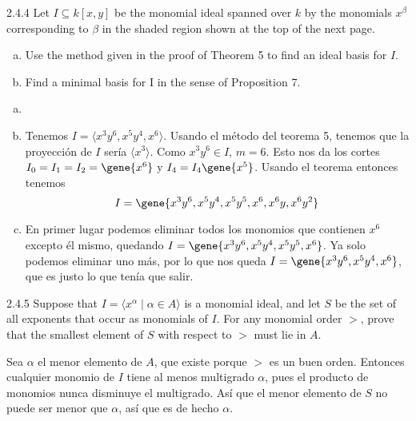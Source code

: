 \documentclass[twoside]{article}
\begin{document}
\newpage

\begin{ejercicio}{2.4.4}
Let $I ⊆ k[x, y]$ be the monomial ideal spanned over $k$ by the monomials $x^{β}$ corresponding
to $β$ in the shaded region shown at the top of the next page.
\begin{enumerate}[a.]
\item Use the method given in the proof of Theorem 5 to find an ideal basis for $I$.
\item Find a minimal basis for I in the sense of Proposition 7.
\end{enumerate}
\end{ejercicio}
\begin{solucion}
\begin{enumerate}[a.]
\item[]
\item Tenemos $I=\langle x^3y^6,x^5y^4, x^6\rangle$. Usando el método del teorema 5, tenemos que la proyección de $I$ sería $\langle x^3\rangle$. Como $x^3y^6\in I$, $m=6$. Esto nos da los cortes $I_0=I_1=I_2=\gene{x^6}$ y $I_4=I_4\gene{x^5}$. Usando el teorema entonces tenemos $$I=\gene{ x^3y^6,x^5y^4,x^5y^5, x^6,x^6y, x^6y^2}$$
\item En primer lugar podemos eliminar todos los monomios que contienen $x^6$ excepto él mismo, quedando $I=\gene{ x^3y^6,x^5y^4,x^5y^5, x^6}$. Ya solo podemos eliminar uno más, por lo que nos queda $I=\gene{ x^3y^6,x^5y^4, x^6}$, que es justo lo que tenía que salir.
\end{enumerate}
\end{solucion}
\newpage

\begin{ejercicio}{2.4.5}
Suppose that $I =\langle 
x^{α} \mid α ∈ A\rangle$ is a monomial ideal, and let $S$ be the set of all exponents
that occur as monomials of $I$. For any monomial order $>$, prove that the smallest element
of $S$ with respect to $>$ must lie in $A$.
\end{ejercicio}
\begin{solucion}
Sea $\alpha$ el menor elemento de $A$, que existe porque $>$ es un buen orden. Entonces cualquier monomio de $I$ tiene al menos multigrado $\alpha$, pues el producto de monomios nunca disminuye el multigrado. Así que el menor elemento de $S$ no puede ser menor que $\alpha$, así que es de hecho $\alpha$.
\end{solucion}

\newpage
\end{document}
